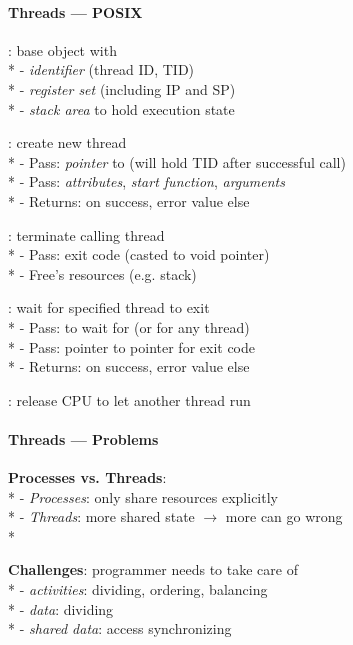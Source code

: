 \paragraph{Threads --- POSIX}
\begin{items}
  \item {}: base object with \\*
    - \emph{identifier} (thread ID, TID) \\*
    - \emph{register set} (including IP and SP) \\*
    - \emph{stack area} to hold execution state
  \item {}: create new thread \\*
    - Pass: \emph{pointer} to  (will hold TID after successful call) \\*
    - Pass: \emph{attributes}, \emph{start function}, \emph{arguments} \\*
    - Returns:  on success, error value else
  \item {}: terminate calling thread \\*
    - Pass: exit code (casted to void pointer) \\*
    - Free's resources (e.g. stack)
  \item {}: wait for specified thread to exit \\*
    - Pass:  to wait for (or  for any thread) \\*
    - Pass: pointer to pointer for exit code \\*
    - Returns:  on success, error value else
  \item {}: release CPU to let another thread run
\end{items}

\paragraph{Threads --- Problems}
\begin{items}
  \item \textbf{Processes vs. Threads}: \\*
    - \emph{Processes}: only share resources explicitly \\*
    - \emph{Threads}: more shared state \( \to \) more can go wrong \\*
  \item \textbf{Challenges}: programmer needs to take care of \\*
    - \emph{activities}: dividing, ordering, balancing \\*
    - \emph{data}: dividing \\*
    - \emph{shared data}: access synchronizing
\end{items}

